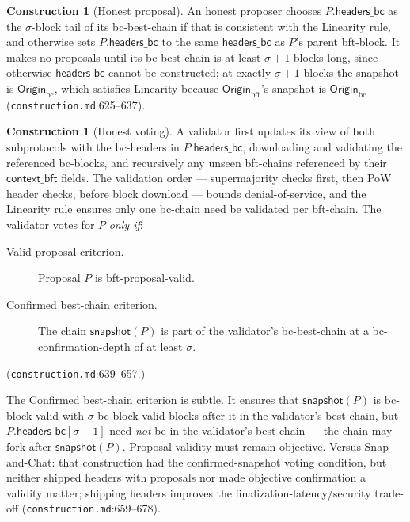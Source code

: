 \documentclass[11pt,a4paper]{article}
\theoremstyle{definition}
\newtheorem{construction}[theorem]{Construction}
\begin{document}
\begin{construction}[Honest proposal]\label{def:xl-honest-proposal}
An honest proposer chooses $P.\mathsf{headers\_bc}$ as the $\sigma$-block
tail of its bc-best-chain if that is consistent with the Linearity rule,
and otherwise sets $P.\mathsf{headers\_bc}$ to the same
$\mathsf{headers\_bc}$ as $P$'s parent bft-block. It makes no proposals
until its bc-best-chain is at least $\sigma + 1$ blocks long, since
otherwise $\mathsf{headers\_bc}$ cannot be constructed; at exactly $\sigma
+ 1$ blocks the snapshot is $\mathsf{Origin}_{\mathrm{bc}}$, which
satisfies Linearity because $\mathsf{Origin}_{\mathrm{bft}}$'s snapshot is
$\mathsf{Origin}_{\mathrm{bc}}$ (\texttt{construction.md}:625--637).
\end{construction}

\begin{construction}[Honest voting]\label{def:xl-honest-voting}
A validator first updates its view of both subprotocols with the
bc-headers in $P.\mathsf{headers\_bc}$, downloading and validating the
referenced bc-blocks, and recursively any unseen bft-chains referenced by
their $\mathsf{context\_bft}$ fields. The validation order ---
supermajority checks first, then PoW header checks, before block download
--- bounds denial-of-service, and the Linearity rule ensures only one
bc-chain need be validated per bft-chain. The validator votes for $P$
\emph{only if}:
\begin{description}
\item[Valid proposal criterion.] Proposal $P$ is bft-proposal-valid.
\item[Confirmed best-chain criterion.] The chain $\mathsf{snapshot}(P)$ is
  part of the validator's bc-best-chain at a bc-confirmation-depth of at
  least $\sigma$.
\end{description}
(\texttt{construction.md}:639--657.)
\end{construction}

The Confirmed best-chain criterion is subtle. It ensures that
$\mathsf{snapshot}(P)$ is bc-block-valid with $\sigma$ bc-block-valid
blocks after it in the validator's best chain, but
$P.\mathsf{headers\_bc}[\sigma - 1]$ need \emph{not} be in the
validator's best chain --- the chain may fork after
$\mathsf{snapshot}(P)$. Proposal validity must remain objective. Versus
Snap-and-Chat: that construction had the confirmed-snapshot voting
condition, but neither shipped headers with proposals nor made objective
confirmation a validity matter; shipping headers improves the
finalization-latency/security trade-off
(\texttt{construction.md}:659--678).
\end{document}
